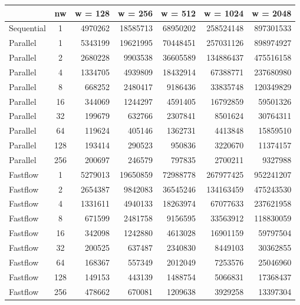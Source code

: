 \begin{tabular}{|l|c|r|r|r|r|r|}
\hline
           & nw  & w = 128 & w = 256  & w = 512  & w = 1024  & w = 2048  \\ \hline
Sequential & 1   & 4970262 & 18585713 & 68950202 & 258524148 & 897301533 \\ \hline
Parallel   & 1   & 5343199 & 19621995 & 70448451 & 257031126 & 898974927 \\ \hline
Parallel   & 2   & 2680228 & 9903538  & 36605589 & 134886437 & 475516158 \\ \hline
Parallel   & 4   & 1334705 & 4939809  & 18432914 & 67388771  & 237680980 \\ \hline
Parallel   & 8   & 668252  & 2480417  & 9186436  & 33835748  & 120349829 \\ \hline
Parallel   & 16  & 344069  & 1244297  & 4591405  & 16792859  & 59501326  \\ \hline
Parallel   & 32  & 199679  & 632766   & 2307841  & 8501624   & 30764311  \\ \hline
Parallel   & 64  & 119624  & 405146   & 1362731  & 4413848   & 15859510  \\ \hline
Parallel   & 128 & 193414  & 290523   & 950836   & 3220670   & 11374157  \\ \hline
Parallel   & 256 & 200697  & 246579   & 797835   & 2700211   & 9327988   \\ \hline
Fastflow   & 1   & 5279013 & 19650859 & 72988778 & 267977425 & 952241207 \\ \hline
Fastflow   & 2   & 2654387 & 9842083  & 36545246 & 134163459 & 475243530 \\ \hline
Fastflow   & 4   & 1331611 & 4940133  & 18263974 & 67077633  & 237621958 \\ \hline
Fastflow   & 8   & 671599  & 2481758  & 9156595  & 33563912  & 118830059 \\ \hline
Fastflow   & 16  & 342098  & 1242880  & 4613028  & 16901159  & 59797504  \\ \hline
Fastflow   & 32  & 200525  & 637487   & 2340830  & 8449103   & 30362855  \\ \hline
Fastflow   & 64  & 168367  & 557349   & 2012049  & 7253576   & 25046960  \\ \hline
Fastflow   & 128 & 149153  & 443139   & 1488754  & 5066831   & 17368437  \\ \hline
Fastflow   & 256 & 478662  & 670081   & 1209638  & 3929258   & 13397304  \\ \hline
\end{tabular}